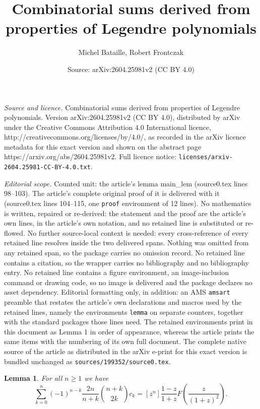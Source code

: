 \documentclass[10pt,a4paper]{amsart}
\title{Combinatorial sums derived from properties of Legendre polynomials}
\author{Michel Bataille, Robert Frontczak}
\date{Source: arXiv:2604.25981v2 (CC BY 4.0)}
\newtheorem{lemma}{Lemma}
\begin{document}
\maketitle

\noindent\emph{Source and licence.} Combinatorial sums derived from properties of Legendre polynomials. Version arXiv:2604.25981v2 (CC BY 4.0), distributed by arXiv under the Creative Commons Attribution 4.0 International licence, http://creativecommons.org/licenses/by/4.0/, as recorded in the arXiv licence metadata for this exact version and shown on the abstract page https://arxiv.org/abs/2604.25981v2. Full licence notice: \texttt{licenses/arxiv-2604.25981-CC-BY-4.0.txt}.\par\smallskip

\noindent\textit{Editorial scope.} Counted unit: the article's lemma main\_lem (source0.tex lines 98--103). The article's complete original proof of it is delivered with it (source0.tex lines 104--115, one \texttt{proof} environment of 12 lines). No mathematics is written, repaired or re-derived: the statement and the proof are the article's own lines, in the article's own notation, and no retained line is substituted or re-flowed.  No further source-local context is needed: every cross-reference of every retained line resolves inside the two delivered spans.  Nothing was omitted from any retained span, so the package carries no omission record.  No retained line contains a citation, so the wrapper carries no bibliography and no bibliography entry.  No retained line contains a figure environment, an image-inclusion command or drawing code, so no image is delivered and the package declares no asset dependency.  Editorial formatting only, in addition: an AMS \texttt{amsart} preamble that restates the article's own declarations and macros used by the retained lines, namely the environments \texttt{lemma} on separate counters, together with the standard packages those lines need.  The retained environments print in this document as Lemma 1 in order of appearance, whereas the article prints the same items with the numbering of its own full document.  The complete native source of the article as distributed in the arXiv e-print for this exact version is bundled unchanged as \texttt{sources/199352/source0.tex}.
\begin{lemma}\label{main_lem}
For all $n\geq 1$ we have
\begin{equation}
\sum_{k=0}^n (-1)^{n-k} \frac{2n}{n+k} \binom{n+k}{2k} c_k = [z^n] \frac{1-z}{1+z}F\left (\frac{z}{(1+z)^2}\right ).
\end{equation}
\end{lemma}
\end{document}
